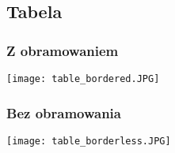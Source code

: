 \subsection{Tabela}

\subsubsection{Z obramowaniem}

\texttt{[image: table\_bordered.JPG]}

\subsubsection{Bez obramowania}

\texttt{[image: table\_borderless.JPG]}